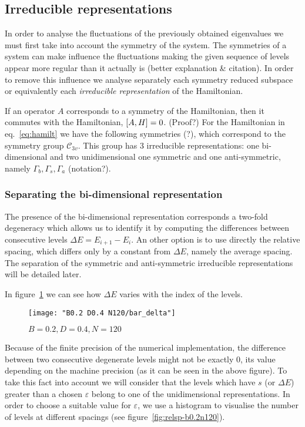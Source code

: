 \documentclass[../thesis.tex]{subfiles}
\begin{document}
\subsection{Irreducible representations}

In order to analyse the fluctuations of the previously obtained eigenvalues
we must first take into account the symmetry of the system. The symmetries of
a system can make influence the fluctuations making the given sequence of levels
appear more regular than it actually is {\color{red} (better explanation \& citation)}.
In order to remove this influence we analyse separately each symmetry reduced subspace
or equivalently each \emph{irreducible representation} of the Hamiltonian.

If an operator $A$ corresponds to a symmetry of the Hamiltonian, then it
commutes with the Hamiltonian, \(\comm{A}{H} = 0\). {\color{red} (Proof?)}
For the Hamiltonian in eq.~\eqref{eq:hamilt} we have the following symmetries {\color{red} (?)},
which correspond to the symmetry group \(\mathcal{C}_{3v}\).
This group has 3 irreducible representations: one bi-dimensional and
two unidimensional one symmetric and one anti-symmetric, namely
\(\Gamma_b, \Gamma_s, \Gamma_a\){\color{red} (notation?)}.

\subsubsection{Separating the bi-dimensional representation}

The presence of the bi-dimensional representation corresponds a two-fold
degeneracy which allows us to identify it by computing the
differences between consecutive levels \(\Delta E = E_{i+1} - E_i\).
An other option is to use directly the relative spacing, which differs only by a
constant from \(\Delta E\), namely the average spacing.
The separation of the symmetric and anti-symmetric irreducible representations
will be detailed later.

In figure~\ref{fig:bar_delta} we can see how \(\Delta E\) varies with the index of the
levels.

\begin{figure}[!h]
  \centering
  \texttt{[image: "B0.2 D0.4 N120/bar\_delta"]}   %
  \caption{\(B=0.2, D=0.4, N=120\)}%
\label{fig:bar_delta}
\end{figure}

Because of the finite precision of the numerical implementation, the
difference between two consecutive degenerate levels might not be exactly 0,
its value depending on the machine precision (as it can be seen in the above figure).
To take this fact into account we will consider that the levels which
have $s$ (or \(\Delta E\)) greater than a chosen \( \varepsilon \) belong
to one of the unidimensional representations.
In order to choose a suitable value for \( \varepsilon \), we use a histogram
to visualise the number of levels at different spacings
(see figure~\ref{fig:relsp-b0.2n120}).
\end{document}
